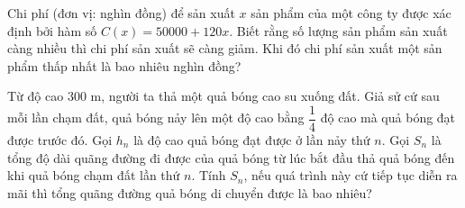 \begin{ex}%
Chi phí (đơn vị: nghìn đồng) để sản xuất $x$ sản phẩm của một công ty được xác định bởi hàm số $C(x)=50000+ 120x$. Biết rằng số lượng sản phẩm sản xuất càng nhiều thì chi phí sản xuất sẽ càng giảm. Khi đó chi phí sản xuất một sản phẩm thấp nhất là bao nhiêu nghìn đồng?
\end{ex}

\begin{ex}%
	Từ độ cao $300$ m, người ta thả một quả bóng cao su xuống đất. Giả sử cứ sau mỗi lần chạm đất, quả bóng nảy lên một độ cao bằng $\dfrac{1}{4}$ độ cao mà quả bóng đạt được trước đó. Gọi $h_n$ là độ cao quả bóng đạt được ở lần nảy thứ $n$. Gọi $S_n$ là tổng độ dài quãng đường đi được của quả bóng từ lúc bắt đầu thả quả bóng đến khi quả bóng chạm đất lần thứ $n$. Tính $S_n$, nếu quá trình này cứ tiếp tục diễn ra mãi thì tổng quãng đường quả bóng di chuyển được là bao nhiêu?
\end{ex}
